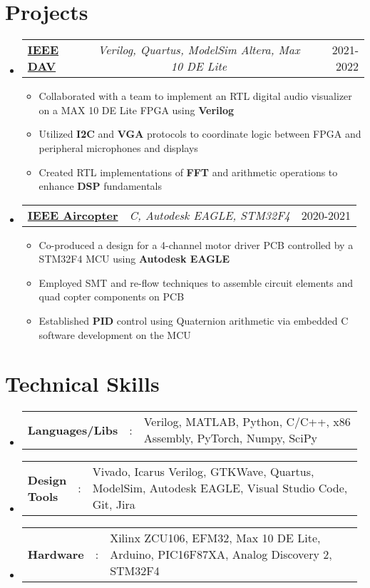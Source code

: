 \documentclass[a4paper,11pt]{article}
\makeatletter
\newcommand{\resumeItem}[1]{
  \item\small{#1}
}
\newcommand{\resumeItemListStart}{\begin{itemize}[rightmargin=0.11in]}
\newcommand{\resumeItemListEnd}{\end{itemize}}
\newcommand{\resumeSectionType}[3]{
  \item\begin{tabular*}{0.96\textwidth}[t]{
    p{0.15\linewidth}p{0.02\linewidth}p{0.81\linewidth}
  }
    \textbf{#1} & #2 & #3
  \end{tabular*}\vspace{-2pt}
}
\newcommand{\resumeTrioHeading}[3]{
  \item\small{
    \begin{tabular*}{0.96\textwidth}[t]{
      l@{\extracolsep{\fill}}c@{\extracolsep{\fill}}r
    }
      \textbf{#1} & \textit{#2} & #3
    \end{tabular*}
  }
}
\newcommand{\resumeHeadingListStart}{
  \begin{itemize}[leftmargin=0.15in, label={}]
}
\newcommand{\resumeHeadingListEnd}{\end{itemize}}
\makeatother
\begin{document}

\section{Projects}
  \resumeHeadingListStart{}
    \resumeTrioHeading{\uline{{IEEE DAV}}}{Verilog, Quartus, ModelSim Altera, Max 10 DE Lite}{2021-2022}
      \resumeItemListStart{}
        \resumeItem{Collaborated with a team to implement an RTL digital audio visualizer on a MAX 10 DE Lite FPGA using \textbf{Verilog}}
        \resumeItem{Utilized \textbf{I2C} and \textbf{VGA}  protocols to coordinate logic between FPGA and peripheral microphones and displays}
        \resumeItem{Created RTL implementations of \textbf{FFT} and arithmetic operations to enhance \textbf{DSP} fundamentals}
      \resumeItemListEnd{}

      \resumeTrioHeading{\uline{IEEE Aircopter}}{C, Autodesk EAGLE, STM32F4}{2020-2021}
      \resumeItemListStart{}
        \resumeItem{Co-produced a design for a 4-channel motor driver PCB controlled by a STM32F4 MCU using \textbf{Autodesk EAGLE}}
        \resumeItem{Employed SMT and re-flow techniques to assemble circuit elements and quad copter components on PCB}
        \resumeItem{Established \textbf{PID} control using Quaternion arithmetic via  embedded C software development on the MCU}
      \resumeItemListEnd{}
  \resumeHeadingListEnd{}



\section{Technical Skills}
  \resumeHeadingListStart{}
    \resumeSectionType{Languages/Libs}{:}{Verilog, MATLAB, Python, C/C++, x86 Assembly, PyTorch, Numpy, SciPy}
    \resumeSectionType{Design Tools}{:}{Vivado, Icarus Verilog, GTKWave, Quartus, ModelSim, Autodesk EAGLE, Visual Studio Code, Git, Jira}
    \resumeSectionType{Hardware}{:}{Xilinx ZCU106, EFM32, Max 10 DE Lite, Arduino, PIC16F87XA, Analog Discovery 2, STM32F4}
  \resumeHeadingListEnd{}
\end{document}
